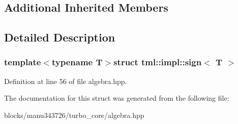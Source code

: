 \subsection*{Additional Inherited Members}


\subsection{Detailed Description}
\subsubsection*{template$<$typename T$>$struct tml\+::impl\+::sign$<$ T $>$}



Definition at line 56 of file algebra.\+hpp.



The documentation for this struct was generated from the following file\+:\begin{DoxyCompactItemize}
\item 
blocks/manu343726/turbo\+\_\+core/algebra.\+hpp\end{DoxyCompactItemize}
